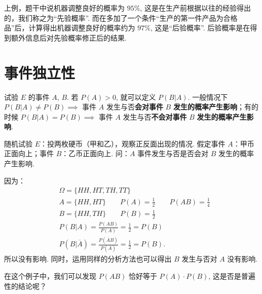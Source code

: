 \documentclass[12pt, a4paper, oneside, UTF8]{ctexbook}
\begin{document}
\begin{rmk}
    上例，题干中说机器调整良好的概率为 \(95\%\), 这是在生产前根据以往的经验得出的，我们称之为“先验概率”. 而在多加了一个条件“生产的第一件产品为合格品”后，计算得出机器调整良好的概率约为 \(97\%\), 这是“后验概率”. 后验概率是在得到额外信息后对先验概率修正后的结果.
\end{rmk}

\section{事件独立性}

试验 \(E\) 的事件 \(A\), \(B\). 若 \(P\left(A\right) > 0\), 就可以定义 \(P\left(B | A\right)\). 一般情况下 \(P\left(B | A\right) \neq P\left(B\right) \implies\) 事件 \(A\) 发生与否\textbf{会对事件} \(B\) \textbf{发生的概率产生影响}；有的时候 \(P\left(B | A\right) = P\left(B\right) \implies\) 事件 \(A\) 发生与否\textbf{不会对事件} \(B\) \textbf{发生的概率产生影响}.

\begin{example}
    随机试验 \(E\)：投两枚硬币（甲和乙），观察正反面出现的情况. 假定事件 \(A\)：甲币正面向上；事件 \(B\)：乙币正面向上. 问：\(A\) 事件发生与否是否会对 \(B\) 发生的概率产生影响.
\end{example}

\begin{solution}
    因为：
    \begin{align*}
        &\Omega = \{HH , HT , TH , TT\}\\
        &A = \{HH , HT\} \qquad P\left(A\right) = \frac{1}{2} \qquad P\left(AB\right) = \frac{1}{4} \\
        &B = \{HH , TH\} \qquad P\left(B\right) = \frac{1}{2}\\
        &P\left(B | A\right) = \frac{P\left(AB\right)}{P\left(A\right)} = \frac{1}{2} = P\left(B\right)\\
        &P\left(B | \overline{A}\right) = \frac{P\left(\overline{A} B\right)}{P\left(\overline{A}\right)} = \frac{1}{2} = P\left(B\right).
    \end{align*}
    所以没有影响. 同时，运用同样的分析方法也可以得出 \(B\) 发生与否对 \(A\) 没有影响.
\end{solution}

\begin{rmk}
    在这个例子中，我们可以发现 \(P\left(AB\right)\) 恰好等于 \(P\left(A\right)\cdot P\left(B\right)\), 这是否是普遍性的结论呢？
\end{rmk}
\end{document}
